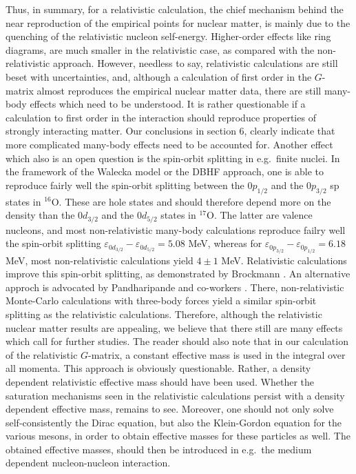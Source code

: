 Thus, in summary, for a relativistic calculation, the chief mechanism
behind the near reproduction of the empirical points for nuclear 
matter, is mainly due to the quenching of the relativistic 
nucleon self-energy. Higher-order effects like ring diagrams, are
much smaller in the relativistic case, as compared with the 
non-relativistic approach. However, needless to say, relativistic
calculations are still beset with uncertainties, and, although
a calculation of first order in the $G$-matrix almost 
reproduces the empirical nuclear matter data, 
there are still many-body effects 
which need to be understood. It is rather questionable if a
calculation to first order in the interaction should reproduce
properties of strongly interacting matter. Our conclusions
in section 6, clearly indicate that more complicated 
many-body effects need to be accounted for. Another effect
which also is an open question is the spin-orbit splitting
in e.g.\ finite nuclei. In the framework of the Walecka model
or the DBHF approach, one is able to reproduce fairly well
the spin-orbit splitting between the 
$0p_{1/2}$ and the $0p_{3/2}$ sp states in $^{16}$O. These are hole
states and should therefore depend more on the density than
the $0d_{3/2}$ and the $0d_{5/2}$ states in $^{17}$O. The latter
are valence nucleons, and most non-relativistic many-body
calculations reproduce failry well the spin-orbit splitting
$\varepsilon_{0d_{3/2}}-\varepsilon_{0d_{5/2}}=5.08$ MeV, whereas
for $\varepsilon_{0p_{3/2}}-\varepsilon_{0p_{1/2}}=6.18$ MeV, most
non-relativistic calculations yield $4\pm 1$ MeV. Relativistic
calculations improve this spin-orbit splitting, as demonstrated
by Brockmann \cite{br78}. An alternative approch is advocated
by Pandharipande and co-workers \cite{pand93}. There, non-relativistic
Monte-Carlo calculations with three-body forces yield a
similar spin-orbit splitting as the relativistic calculations.  
Therefore, although the relativistic 
nuclear matter results are appealing,
we believe that there still are many effects which call for further
studies. The reader should also note that in our calculation
of the relativistic $G$-matrix, a constant effective mass is used 
in the integral over all momenta. This approach is obviously
questionable. Rather, a density dependent relativistic
effective mass should have been used. Whether the saturation
mechanisms seen in the relativistic calculations persist
with a density dependent effective mass, 
remains to see. Moreover, one should not only solve self-consistently
the Dirac equation, but also the Klein-Gordon equation for the various
mesons, in order to obtain effective masses for these particles as 
well. The obtained effective masses, should then be introduced in e.g.\
the medium dependent nucleon-nucleon interaction. 




